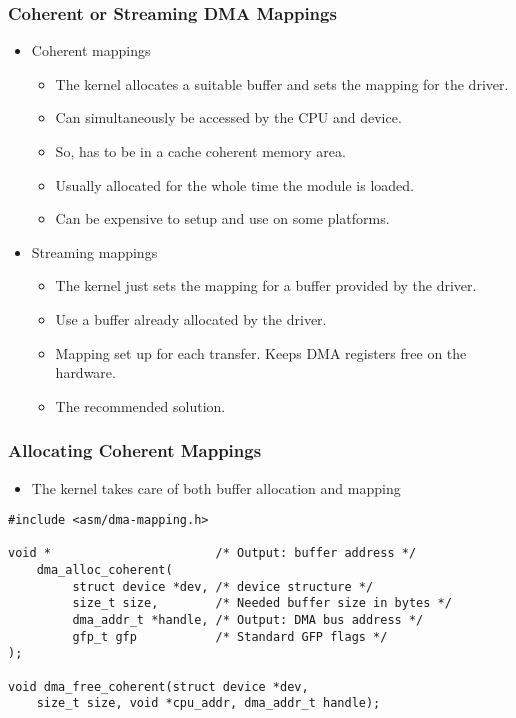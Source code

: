 \begin{frame}
  \frametitle{Coherent or Streaming DMA Mappings}
  \begin{itemize}
  \item Coherent mappings
    \begin{itemize}
    \item The kernel allocates a suitable buffer and sets the mapping
      for the driver.
    \item Can simultaneously be accessed by the CPU and device.
    \item So, has to be in a cache coherent memory area.
    \item Usually allocated for the whole time the module is loaded.
    \item Can be expensive to setup and use on some platforms.
    \end{itemize}
  \item Streaming mappings
    \begin{itemize}
    \item The kernel just sets the mapping for a buffer provided by
      the driver.
    \item Use a buffer already allocated by the driver.
    \item Mapping set up for each transfer. Keeps DMA registers free
      on the hardware.
    \item The recommended solution.
    \end{itemize}
  \end{itemize}
\end{frame}

\begin{frame}[fragile]
  \frametitle{Allocating Coherent Mappings}
  \begin{itemize}
  \item The kernel takes care of both buffer allocation and mapping
  \end{itemize}
\begin{verbatim}
#include <asm/dma-mapping.h>

void *                       /* Output: buffer address */
    dma_alloc_coherent(
         struct device *dev, /* device structure */
         size_t size,        /* Needed buffer size in bytes */
         dma_addr_t *handle, /* Output: DMA bus address */
         gfp_t gfp           /* Standard GFP flags */
);

void dma_free_coherent(struct device *dev,
    size_t size, void *cpu_addr, dma_addr_t handle);
\end{verbatim}
\end{frame}

